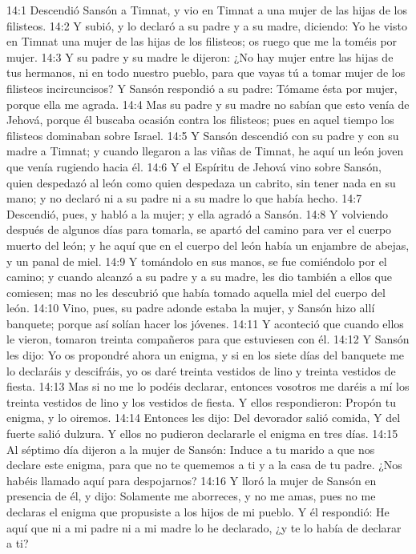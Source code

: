 14:1 Descendió Sansón a Timnat, y vio en Timnat a una mujer de las hijas de los filisteos.  
14:2 Y subió, y lo declaró a su padre y a su madre, diciendo: Yo he visto en Timnat una mujer de las hijas de los filisteos; os ruego que me la toméis por mujer.  
14:3 Y su padre y su madre le dijeron: ¿No hay mujer entre las hijas de tus hermanos, ni en todo nuestro pueblo, para que vayas tú a tomar mujer de los filisteos incircuncisos? Y Sansón respondió a su padre: Tómame ésta por mujer, porque ella me agrada.  
14:4 Mas su padre y su madre no sabían que esto venía de Jehová, porque él buscaba ocasión contra los filisteos; pues en aquel tiempo los filisteos dominaban sobre Israel.  
14:5 Y Sansón descendió con su padre y con su madre a Timnat; y cuando llegaron a las viñas de Timnat, he aquí un león joven que venía rugiendo hacia él.  
14:6 Y el Espíritu de Jehová vino sobre Sansón, quien despedazó al león como quien despedaza un cabrito, sin tener nada en su mano; y no declaró ni a su padre ni a su madre lo que había hecho.  
14:7 Descendió, pues, y habló a la mujer; y ella agradó a Sansón.  
14:8 Y volviendo después de algunos días para tomarla, se apartó del camino para ver el cuerpo muerto del león; y he aquí que en el cuerpo del león había un enjambre de abejas, y un panal de miel.  
14:9 Y tomándolo en sus manos, se fue comiéndolo por el camino; y cuando alcanzó a su padre y a su madre, les dio también a ellos que comiesen; mas no les descubrió que había tomado aquella miel del cuerpo del león.  
14:10 Vino, pues, su padre adonde estaba la mujer, y Sansón hizo allí banquete; porque así solían hacer los jóvenes.  
14:11 Y aconteció que cuando ellos le vieron, tomaron treinta compañeros para que estuviesen con él.  
14:12 Y Sansón les dijo: Yo os propondré ahora un enigma, y si en los siete días del banquete me lo declaráis y descifráis, yo os daré treinta vestidos de lino y treinta vestidos de fiesta.  
14:13 Mas si no me lo podéis declarar, entonces vosotros me daréis a mí los treinta vestidos de lino y los vestidos de fiesta. Y ellos respondieron: Propón tu enigma, y lo oiremos.  
14:14 Entonces les dijo:  
Del devorador salió comida,  
Y del fuerte salió dulzura.  
Y ellos no pudieron declararle el enigma en tres días.  
14:15 Al séptimo día dijeron a la mujer de Sansón: Induce a tu marido a que nos declare este enigma, para que no te quememos a ti y a la casa de tu padre. ¿Nos habéis llamado aquí para despojarnos?  
14:16 Y lloró la mujer de Sansón en presencia de él, y dijo: Solamente me aborreces, y no me amas, pues no me declaras el enigma que propusiste a los hijos de mi pueblo. Y él respondió: He aquí que ni a mi padre ni a mi madre lo he declarado, ¿y te lo había de declarar a ti?  

